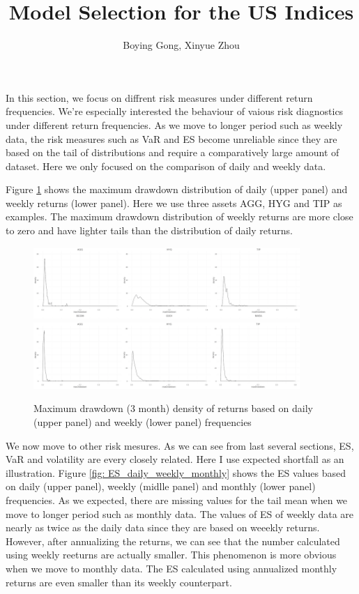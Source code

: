 \documentclass[12pt]{article}
\title{Model Selection for the US Indices}
\author{Boying Gong, Xinyue Zhou}
\begin{document}
\maketitle

\fi


In this section, we focus on diffrent risk measures under different return frequencies. We're especially interested the behaviour of vaious risk diagnostics under different return frequencies. As we move to longer period such as weekly data, the risk measures such as VaR and ES become unreliable since they are based on the tail of distributions and require a comparatively large amount of dataset. Here we only focused on the comparison of daily and weekly data. 

Figure \ref{fig: mdd_dist_daily_weekly} shows the maximum drawdown distribution of daily (upper panel) and weekly returns (lower panel). Here we use three assets AGG, HYG and TIP as examples. The maximum drawdown distribution of weekly returns are more close to zero and have lighter tails than the distribution of daily returns.

\begin{figure}[h]
\caption{Maximum drawdown (3 month) density of returns based on daily (upper panel) and weekly (lower panel) frequencies} 
\centering 
\includegraphics[width=0.9\textwidth]{../figures/maxDrawdown_CED/daily_mdd}
\includegraphics[width=0.9\textwidth]{../figures/maxDrawdown_CED/weekly_mdd}
\label{fig: mdd_dist_daily_weekly}
\end{figure}

We now move to other risk mesures. As we can see from last several sections, ES, VaR and volatility are every closely related. Here I use expected shortfall as an illustration. Figure \ref{fig: ES_daily_weekly_monthly} shows the ES values based on daily (upper panel), weekly (midlle panel) and monthly (lower panel) frequencies. As we expected, there are missing values for the tail mean when we move to longer period such as monthly data. The values of ES of weekly data are nearly as twice as the daily data since they are based on weeekly returns. However, after annualizing the returns, we can see that the number calculated using weekly reeturns are actually smaller. This phenomenon is more obvious when we move to monthly data. The ES calculated using annualized monthly returns are even smaller than its weekly counterpart.
\end{document}
